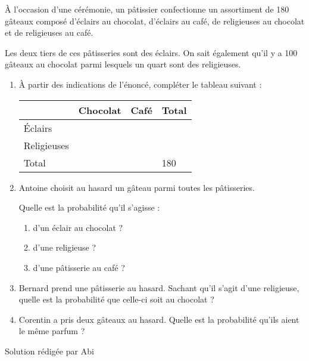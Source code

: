 
%
À l'occasion d'une cérémonie, un pâtissier confectionne un assortiment de 180 gâteaux composé d'éclairs au chocolat, d'éclairs au café, de  religieuses au chocolat et de religieuses au café.
\par
Les deux tiers de ces pâtisseries sont des éclairs. On sait également qu'il y a 100 gâteaux au chocolat parmi lesquels un quart sont des religieuses.
\begin{enumerate}
     \item
     À partir des indications de l'énoncé, compléter le tableau suivant :
     \begin{tabularx}{0.8\linewidth}{|*{3}{>{\centering \arraybackslash }X|}}%
          \hline
             &  Chocolat &    Café    &    Total  \\ \hline
           Éclairs         &    &    &   \\ \hline
           Religieuses         &    &    &   \\ \hline
           Total         &    &    & 180 \\ \hline
     \end{tabularx}
     \item
     Antoine choisit au hasard un gâteau parmi toutes les pâtisseries.
     \par
     Quelle est la probabilité qu'il s'agisse :
     \begin{enumerate}
          \item
          d'un éclair au chocolat ?
          \item
          d'une religieuse ?
          \item
          d'une pâtisserie au café ?
     \end{enumerate}
     \item
     Bernard prend une pâtisserie au hasard. Sachant qu'il s'agit d'une religieuse, quelle est la probabilité que celle-ci  soit au chocolat ?
     \item
     Corentin a pris deux gâteaux au hasard. Quelle est la probabilité qu'ils aient le même parfum ?
\end{enumerate}
\begin{corrige}
     Solution rédigée par Abi
\\
\end{corrige}

